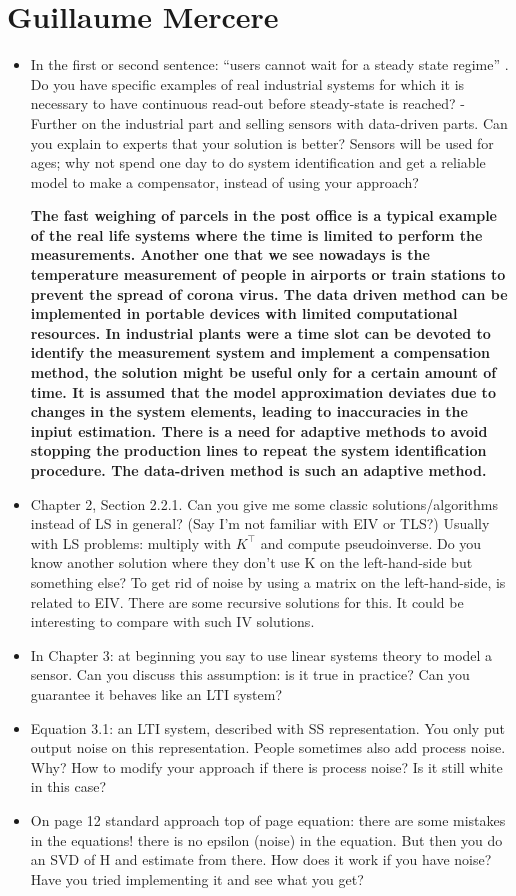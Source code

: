 \documentclass[11pt]{article}
\begin{document}
\section*{Guillaume Mercere}

\begin{itemize}
	\item In the first or second sentence: “users cannot wait for a steady state regime” . Do you have specific examples of real industrial systems for which it is necessary to have continuous read-out before steady-state is reached? - Further on the industrial part and selling sensors with data-driven parts. Can you explain to experts that your solution is better? Sensors will be used for ages; why not spend one day to do system identification and get a reliable model to make a compensator, instead of using your approach?
	
	{\bfseries The fast weighing of parcels in the post office is a typical example of the real life systems where the time is limited to perform the measurements. Another one that we see nowadays is the temperature measurement of people in airports or train stations to prevent the spread of corona virus. The data driven method can be implemented in portable devices with limited computational resources. In industrial plants were a time slot can be devoted to identify the measurement system and implement a compensation method, the solution might be useful only for a certain amount of time. It is assumed that the model approximation deviates due to changes in the system elements, leading to inaccuracies in the inpiut estimation. There is a need for adaptive methods to avoid stopping the production lines to repeat the system identification procedure. The data-driven method is such an adaptive method. }
	
	\item  Chapter 2, Section 2.2.1. Can you give me some classic solutions/algorithms instead of LS in general? (Say I'm not familiar with EIV or TLS?) Usually with LS problems: multiply with $K^\top$ and compute pseudoinverse. Do you know another solution where they don't use K on the left-hand-side but something else? To get rid of noise by using a matrix on the left-hand-side, is related to EIV. There are some recursive solutions for this. It could be interesting to compare with such IV solutions.
	\item  In Chapter 3: at beginning you say to use linear systems theory to model a sensor. Can you discuss this assumption: is it true in practice? Can you guarantee it behaves like an LTI system?
	\item  Equation 3.1: an LTI system, described with SS representation. You only put output noise on this representation. People sometimes also add process noise. Why? How to modify your approach if there is process noise? Is it still white in this case?
	\item  On page 12 standard approach top of page equation: there are some mistakes in the equations! there is no epsilon (noise) in the equation. But then you do an SVD of H and estimate from there. How does it work if you have noise? Have you tried implementing it and see what you get?
	

\end{itemize}
\end{document}
